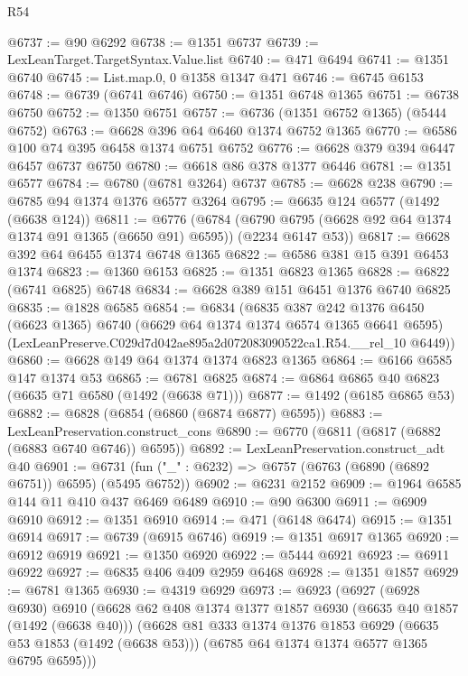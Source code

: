 \begin{lexlean}{R54}
\begin{coremodule}
@6737 := @90 @6292
@6738 := @1351 @6737
@6739 := LexLeanTarget.TargetSyntax.Value.list
@6740 := @471 @6494
@6741 := @1351 @6740
@6745 := List.map.{0, 0} @1358 @1347 @471
@6746 := @6745 @6153
@6748 := @6739 (@6741 @6746)
@6750 := @1351 @6748 @1365
@6751 := @6738 @6750
@6752 := @1350 @6751
@6757 := @6736 (@1351 @6752 @1365) (@5444 @6752)
@6763 := @6628 @396 @64 @6460 @1374 @6752 @1365
@6770 := @6586 @100 @74 @395 @6458 @1374 @6751 @6752
@6776 := @6628 @379 @394 @6447 @6457 @6737 @6750
@6780 := @6618 @86 @378 @1377 @6446
@6781 := @1351 @6577
@6784 := @6780 (@6781 @3264) @6737
@6785 := @6628 @238
@6790 := @6785 @94 @1374 @1376 @6577 @3264
@6795 := @6635 @124 @6577 (@1492 (@6638 @124))
@6811 := @6776
    (@6784 (@6790 @6795 (@6628 @92 @64 @1374 @1374 @91 @1365 (@6650 @91) @6595)) (@2234 @6147 @53))
@6817 := @6628 @392 @64 @6455 @1374 @6748 @1365
@6822 := @6586 @381 @15 @391 @6453 @1374
@6823 := @1360 @6153
@6825 := @1351 @6823 @1365
@6828 := @6822 (@6741 @6825) @6748
@6834 := @6628 @389 @151 @6451 @1376 @6740 @6825
@6835 := @1828 @6585
@6854 := @6834
    (@6835
      @387
      @242
      @1376
      @6450
      (@6623 @1365)
      @6740
      (@6629 @64 @1374 @1374 @6574 @1365 @6641 @6595)
      (LexLeanPreserve.C029d7d042ae895a2d072083090522ca1.R54.__rel_10 @6449))
@6860 := @6628 @149 @64 @1374 @1374 @6823 @1365
@6864 := @6166 @6585 @147 @1374 @53
@6865 := @6781 @6825
@6874 := @6864 @6865 @40 @6823 (@6635 @71 @6580 (@1492 (@6638 @71)))
@6877 := @1492 (@6185 @6865 @53)
@6882 := @6828 (@6854 (@6860 (@6874 @6877) @6595))
@6883 := LexLeanPreservation.construct_cons
@6890 := @6770 (@6811 (@6817 (@6882 (@6883 @6740 @6746)) @6595))
@6892 := LexLeanPreservation.construct_adt @40
@6901 := @6731 (fun ("_" : @6232) => @6757 (@6763 (@6890 (@6892 @6751)) @6595) (@5495 @6752))
@6902 := @6231 @2152
@6909 := @1964 @6585 @144 @11 @410 @437 @6469 @6489
@6910 := @90 @6300
@6911 := @6909 @6910
@6912 := @1351 @6910
@6914 := @471 (@6148 @6474)
@6915 := @1351 @6914
@6917 := @6739 (@6915 @6746)
@6919 := @1351 @6917 @1365
@6920 := @6912 @6919
@6921 := @1350 @6920
@6922 := @5444 @6921
@6923 := @6911 @6922
@6927 := @6835 @406 @409 @2959 @6468
@6928 := @1351 @1857
@6929 := @6781 @1365
@6930 := @4319 @6929
@6973 := @6923
    (@6927
      (@6928 @6930)
      @6910
      (@6628
        @62
        @408
        @1374
        @1377
        @1857
        @6930
        (@6635 @40 @1857 (@1492 (@6638 @40)))
        (@6628
          @81
          @333
          @1374
          @1376
          @1853
          @6929
          (@6635 @53 @1853 (@1492 (@6638 @53)))
          (@6785 @64 @1374 @1374 @6577 @1365 @6795 @6595)))

\end{coremodule}
\end{lexlean}
